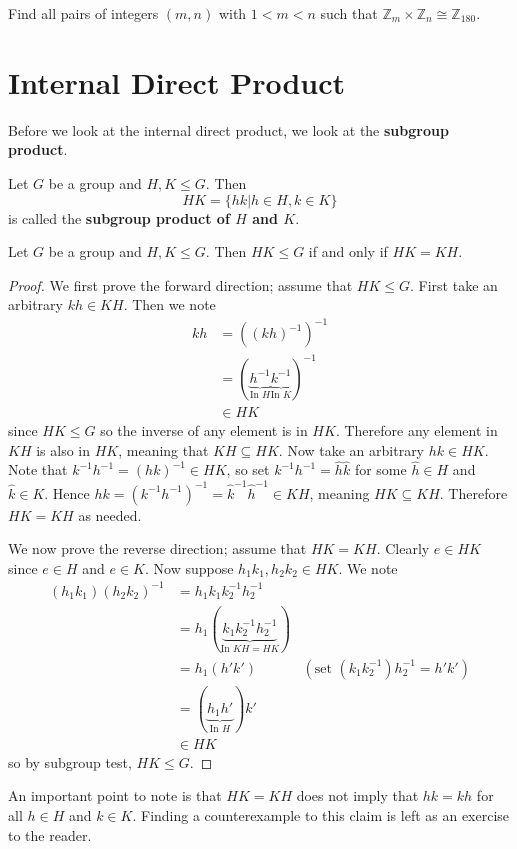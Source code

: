 \begin{exercise}
    Find all pairs of integers $(m, n)$ with $1 < m < n$ such that $\mathbb{Z}_m \times \mathbb{Z}_n \cong \mathbb{Z}_{180}$.
\end{exercise}

\section{Internal Direct Product}
Before we look at the internal direct product, we look at the \textbf{subgroup product}.
\begin{definition}
    Let $G$ be a group and $H, K \leq G$. Then
    \[
        HK = \{hk \vert h \in H, k \in K\}
    \]
    is called the \textbf{subgroup product of $H$ and $K$}.
\end{definition}

\begin{proposition}\label{prop-subgroup-product-is-subgroup}
    Let $G$ be a group and $H, K \leq G$. Then $HK \leq G$ if and only if $HK = KH$.
\end{proposition}

\newpage

\begin{proof}
    We first prove the forward direction; assume that $HK \leq G$. First take an arbitrary $kh \in KH$. Then we note
    \begin{align*}
        kh &= \left(\left(kh\right)^{-1}\right)^{-1}\\
        &= (\underbrace{h^{-1}}_{\text{In } H}\underbrace{k^{-1}}_{\text{In } K})^{-1}\\
        &\in HK
    \end{align*}
    since $HK \leq G$ so the inverse of any element is in $HK$. Therefore any element in $KH$ is also in $HK$, meaning that $KH \subseteq HK$. Now take an arbitrary $hk \in HK$. Note that $k^{-1}h^{-1} = (hk)^{-1} \in HK$, so set $k^{-1}h^{-1} = \hat{h}\hat{k}$ for some $\hat{h} \in H$ and $\hat{k} \in K$. Hence $hk = \left(k^{-1}h^{-1}\right)^{-1} = \hat{k}^{-1}\hat{h}^{-1} \in KH$, meaning $HK \subseteq KH$. Therefore $HK = KH$ as needed.

    We now prove the reverse direction; assume that $HK = KH$. Clearly $e \in HK$ since $e \in H$ and $e \in K$. Now suppose $h_1k_1, h_2k_2 \in HK$. We note
    \begin{align*}
        (h_1k_1)(h_2k_2)^{-1} &= h_1k_1k_2^{-1}h_2^{-1}\\
        &= h_1(\underbrace{k_1k_2^{-1}h_2^{-1}}_{\text{In } KH = HK})\\
        &= h_1(h'k') & (\text{set }(k_1k_2^{-1})h_2^{-1} = h'k')\\
        &= (\underbrace{h_1h'}_{\text{In } H})k'\\
        &\in HK
    \end{align*}
    so by subgroup test, $HK \leq G$.
\end{proof}
An important point to note is that $HK = KH$ does not imply that $hk = kh$ for all $h \in H$ and $k \in K$. Finding a counterexample to this claim is left as an exercise to the reader.

